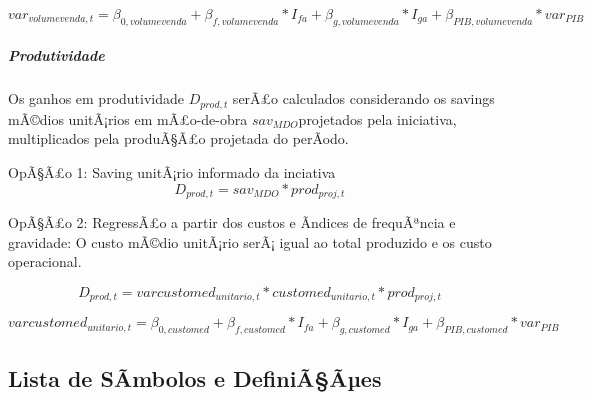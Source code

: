 \documentclass[]{article}
\let\oldsubparagraph\subparagraph
\renewcommand{\subparagraph}[1]{\oldsubparagraph{#1}\mbox{}}
\begin{document}
\[var_{volumevenda,t} = \beta_{0,volumevenda} +\beta_{f,volumevenda} * I_{fa} + \beta_{g,volumevenda} * I_{ga} + \beta_{PIB,volumevenda} * var_{PIB}\]

\subparagraph{Produtividade}\label{produtividade}

Os ganhos em produtividade \(D_{prod,t}\) serÃ£o calculados considerando
os savings mÃ©dios unitÃ¡rios em mÃ£o-de-obra \(sav_{MDO}\)projetados
pela iniciativa, multiplicados pela produÃ§Ã£o projetada do perÃ­odo.

OpÃ§Ã£o 1: Saving unitÃ¡rio informado da inciativa
\[D_{prod,t} = sav_{MDO} * prod_{proj,t}\]

OpÃ§Ã£o 2: RegressÃ£o a partir dos custos e Ã­ndices de frequÃªncia e
gravidade: O custo mÃ©dio unitÃ¡rio serÃ¡ igual ao total produzido e os
custo operacional.

\[D_{prod,t} = varcustomed_{unitario,t} * customed_{unitario,t} * prod_{proj,t}\]

\[varcustomed_{unitario,t} = \beta_{0,customed} +\beta_{f,customed} * I_{fa} + \beta_{g,customed} * I_{ga} + \beta_{PIB,customed} * var_{PIB}\]

\subsection{Lista de SÃ­mbolos e
DefiniÃ§Ãµes}\label{lista-de-sambolos-e-definiaaes}
\end{document}
